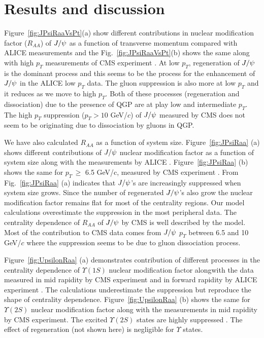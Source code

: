 \documentclass[aps,prc,preprint,superscriptaddress,showpacs,showkeys]{revtex4-1}
\begin{document}
\section{Results and discussion}
  Figure~\ref{fig:JPsiRaaVsPt}(a) show different contributions in nuclear modification factor 
($R_{AA}$) of $J/\psi$ as a function of transverse momentum compared with ALICE measurements
\cite{Abelev:2013ila} and the Fig.~\ref{fig:JPsiRaaVsPt}(b) shows the same along with
high $p_T$ measurements of CMS experiment \cite{Mironov:2013jaa}. 
  At low $p_T$, regeneration of $J/\psi$ is the dominant process and this seems to be the process
for the enhancement of $J/\psi$ in the ALICE low $p_T$ data.
  The gluon suppression is also more at low $p_T$ and it reduces as we move to high $p_T$. 
Both of these processes (regeneration and dissociation) due to the presence of QGP are 
at play low and intermediate $p_T$. The high $p_T$ suppression ($p_T > 10$  GeV/$c$) of $J/\psi$ 
measured by CMS does not seem to be originating due to dissociation by gluons in QGP.

  We have also calculated $R_{AA}$ as a function of system size.
 Figure~\ref{fig:JPsiRaa} (a) shows different contributions of $J/\psi$ 
nuclear modification factor as a function of system size along with the measurements 
by ALICE \cite{Abelev:2013ila}.
  Figure~\ref{fig:JPsiRaa} (b) shows the same for $p_{T}\,\geq$ 6.5 GeV/c, measured 
by CMS experiment \cite{Mironov:2013jaa}. 
 From Fig.~\ref{fig:JPsiRaa} (a) indicates that  $J/\psi$'s are increasingly suppressed 
when system size grows. Since the number of regenerated   $J/\psi$'s also grow the nuclear 
modification factor remains flat for most of the centrality regions. Our model calculations
overestimate the suppression in the most peripheral data.
 The centrality dependence of $R_{AA}$ of $J/\psi$ by CMS is well described by the model.
 Most of the contribution to CMS data comes from $J/\psi$ $p_T$ between 6.5 and 10 GeV/$c$ where 
the suppression seems to be due to gluon dissociation process.


  Figure~\ref{fig:UpsilonRaa} (a) demonstrates contribution of different processes in the 
centrality dependence of $\Upsilon(1S)$ nuclear modification factor alongwith the data
measured in mid rapidity by CMS experiment\cite{Chatrchyan:2012lxa} and in forward rapidity 
by ALICE experiment \cite{Abelev:2014nua}. 
  The calculations underestimate the suppression but reproduce the shape of centrality dependence.
Figure~\ref{fig:UpsilonRaa} (b) shows the same for $\Upsilon(2S)$ nuclear modification factor
along with the measurements in mid rapidity by CMS experiment. The excited $\Upsilon(2S)$ states 
are highly suppressed .
 The effect of regeneration (not shown here) is negligible for $\Upsilon$ states.
\end{document}
